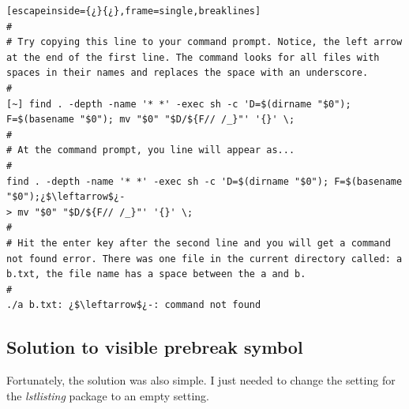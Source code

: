 
\begin{lstlisting}[escapeinside={¿}{¿},frame=single,breaklines]
#
# Try copying this line to your command prompt. Notice, the left arrow at the end of the first line. The command looks for all files with spaces in their names and replaces the space with an underscore.
#
[~] find . -depth -name '* *' -exec sh -c 'D=$(dirname "$0"); F=$(basename "$0"); mv "$0" "$D/${F// /_}"' '{}' \;
#
# At the command prompt, you line will appear as...
#
find . -depth -name '* *' -exec sh -c 'D=$(dirname "$0"); F=$(basename "$0");¿$\leftarrow$¿-
> mv "$0" "$D/${F// /_}"' '{}' \;
#
# Hit the enter key after the second line and you will get a command not found error. There was one file in the current directory called: a b.txt, the file name has a space between the a and b.
#
./a b.txt: ¿$\leftarrow$¿-: command not found
\end{lstlisting}

\subsection{Solution to visible prebreak symbol}

Fortunately, the solution was also simple. I just needed to change the  setting for the \emph{lstlisting} package to an empty setting.


